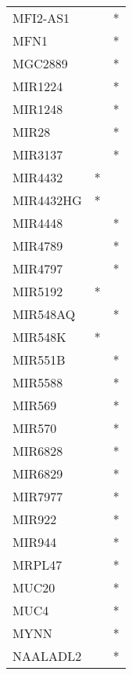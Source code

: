 \begin{longtable}{lcc}
MFI2-AS1         &                &          * \\
MFN1             &                &          * \\
MGC2889          &                &          * \\
MIR1224          &                &          * \\
MIR1248          &                &          * \\
MIR28            &                &          * \\
MIR3137          &                &          * \\
MIR4432          &              * &            \\
MIR4432HG        &              * &            \\
MIR4448          &                &          * \\
MIR4789          &                &          * \\
MIR4797          &                &          * \\
MIR5192          &              * &            \\
MIR548AQ         &                &          * \\
MIR548K          &              * &            \\
MIR551B          &                &          * \\
MIR5588          &                &          * \\
MIR569           &                &          * \\
MIR570           &                &          * \\
MIR6828          &                &          * \\
MIR6829          &                &          * \\
MIR7977          &                &          * \\
MIR922           &                &          * \\
MIR944           &                &          * \\
MRPL47           &                &          * \\
MUC20            &                &          * \\
MUC4             &                &          * \\
MYNN             &                &          * \\
NAALADL2         &                &          * \\

\end{longtable}

